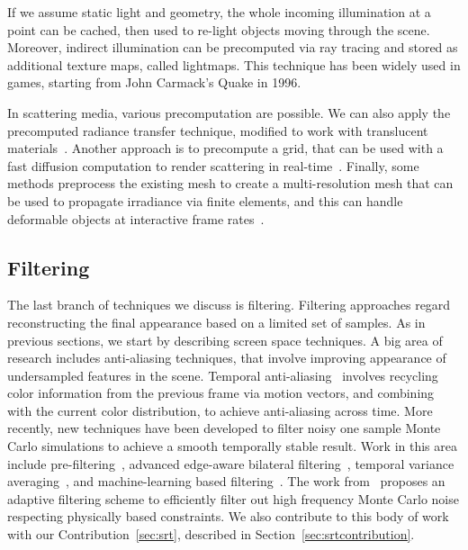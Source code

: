 If we assume static light and geometry, the whole incoming illumination at a point can be cached, then used to re-light objects moving through the scene. Moreover, indirect illumination can be precomputed via ray tracing and stored as additional texture maps, called lightmaps. This technique has been widely used in games, starting from John Carmack's Quake in 1996.    

In scattering media, various precomputation are possible. We can also apply the precomputed radiance transfer technique, modified to work with translucent materials~\cite{Sloan2003}. Another approach is to precompute a grid, that can be used with a fast diffusion computation to render scattering in real-time~\cite{Wang2008a}. Finally, some methods preprocess the existing mesh to create a multi-resolution mesh that can be used to propagate irradiance via finite elements, and this can handle deformable objects at interactive frame rates~\cite{Mertens2003, Li2013}. 

\subsection{Filtering}

The last branch of techniques we discuss is filtering. Filtering approaches regard reconstructing the final appearance based on a limited set of samples. As in previous sections, we start by describing screen space techniques. A big area of research includes anti-aliasing techniques, that involve improving appearance of undersampled features in the scene. Temporal anti-aliasing~\cite{Karis2014,Patney2016} involves recycling color information from the previous frame via motion vectors, and combining with the current color distribution, to achieve anti-aliasing across time. More recently, new techniques have been developed to filter noisy one sample Monte Carlo simulations to achieve a smooth temporally stable result. Work in this area include pre-filtering~\cite{Crassin2015}, advanced edge-aware bilateral filtering~\cite{Mara2017}, temporal variance averaging~\cite{Schied17}, and machine-learning based filtering~\cite{Chaitanya2017}. The work from~\citet{Mehta2013} proposes an adaptive filtering scheme to efficiently filter out high frequency Monte Carlo noise respecting physically based constraints. We also contribute to this body of work with our Contribution~\ref{sec:srt}, described in Section~\ref{sec:srtcontribution}.

